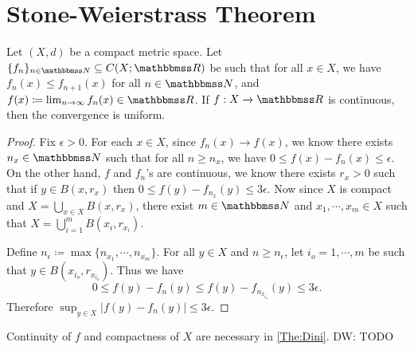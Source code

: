 \documentclass[screen,single]{techreport}
\numberwithin{equation}{section}
\newcommand{\diw}[1]{{\color{Red} DW: #1}}
\begin{document}
\section{Stone-Weierstrass Theorem}

\begin{theorem}\label{The:Dini}
  Let $(X,d)$ be a compact metric space.
  Let $\{f_n\}_{n \in \bbN} \subseteq C(X;\bbR)$ be such that for all $x \in X$, we have $f_n(x) \le f_{n+1}(x)$ for all $n \in \bbN$, and $f(x) \coloneqq \lim_{n \to \infty} f_n(x) \in \bbR$.
  If $f : X \to \bbR$ is continuous, then the convergence is uniform.
\end{theorem}
\begin{proof}
  Fix $\epsilon > 0$.
  For each $x \in X$, since $f_n(x) \rightarrow f(x)$, we know there exists $n_x \in \bbN$ such that for all $n \ge n_x$, we have $0 \le f(x) - f_n(x) \le \epsilon$.
  On the other hand, $f$ and $f_n$'s are continuous, we know there exists $r_x > 0$ such that if $y \in B(x,r_x)$ then $0 \le f(y) - f_{n_x}(y) \le 3\epsilon$.
  Now since $X$ is compact and $X = \bigcup_{x \in X} B(x,r_x)$, there exist $m \in \bbN$ and $x_1,\cdots,x_m \in X$ such that $X = \bigcup_{i=1}^m B(x_i,r_{x_i})$.
  
  Define $n_\epsilon \coloneqq \max\{n_{x_1},\cdots,n_{x_m}\}$.
  For all $y \in X$ and $n \ge n_\epsilon$, let $i_o =1,\cdots,m$ be such that $y \in B(x_{i_o},r_{x_{i_o}})$.
  Thus we have
  \[
  0 \le f(y) - f_n(y) \le f(y) - f_{n_{x_{i_o}}}(y) \le 3\epsilon.
  \]
  Therefore $\sup_{y \in X} |f(y) - f_n(y)| \le 3\epsilon$.
\end{proof}

\begin{remark}\label{Rem:ContCompactNecInDini}
  Continuity of $f$ and compactness of $X$ are necessary in \cref{The:Dini}.
  \diw{TODO}
\end{remark}
\end{document}
